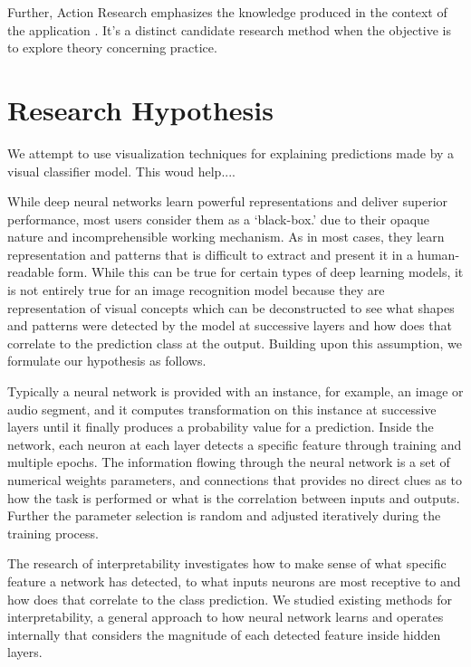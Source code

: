 Further, Action Research emphasizes the knowledge produced in the context of the application \cite{401014119781201}. It’s a distinct candidate research method when the objective is to explore theory concerning practice.

\section{Research Hypothesis}

We attempt to use visualization techniques for explaining predictions made by a visual classifier model. This woud help....

While deep neural networks learn powerful representations and deliver superior performance, most users consider them as a ‘black-box.’ due to their opaque nature and incomprehensible working mechanism. As in most cases, they learn representation and patterns that is difficult to extract and present it in a human-readable form. While this can be true for certain types of deep learning models, it is not entirely true for an image recognition model because they are representation of visual concepts which can be deconstructed to see what shapes and patterns were detected by the model at successive layers and how does that correlate to the prediction class at the output. Building upon this assumption, we formulate our hypothesis as follows.

Typically a neural network is provided with an instance, for example, an image or audio segment, and it computes transformation on this instance at successive layers until it finally produces a probability value for a prediction. Inside the network, each neuron at each layer detects a specific feature through training and multiple epochs. The information flowing through the neural network is a set of numerical weights parameters, and connections that provides no direct clues as to how the task is performed or what is the correlation between inputs and outputs. Further the parameter selection is random and adjusted iteratively during the training process. %

The research of interpretability investigates how to make sense of what specific feature a network has detected, to what inputs neurons are most receptive to and how does that correlate to the class prediction. We studied existing methods for interpretability, a general approach to how neural network learns and operates internally that considers the magnitude of each detected feature inside hidden layers.

